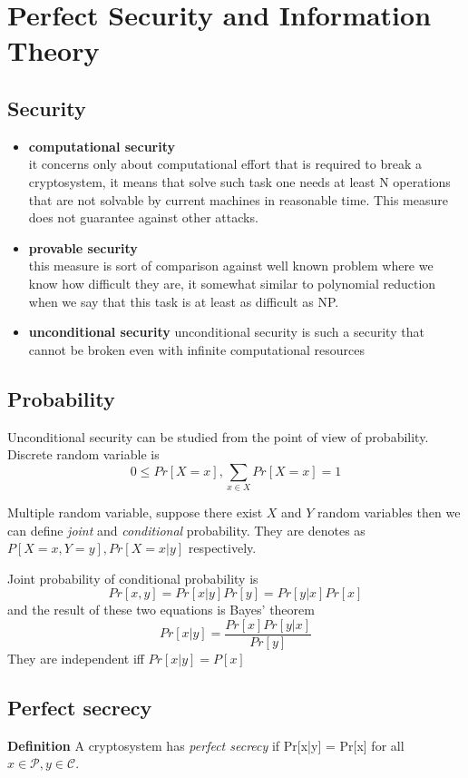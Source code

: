 \documentclass[a4paper,10pt]{article}
\begin{document}
\section*{Perfect Security and Information Theory}
\subsection*{Security}
\begin{itemize}
\item \textbf{computational security}\\ it concerns only about computational effort that is required to break a cryptosystem, it means that solve such task one needs at least N operations that are not solvable by current machines in reasonable time. This measure does not guarantee against other attacks.
\item \textbf{provable security}\\
this measure is sort of comparison against well known problem where we know how difficult they are, it somewhat similar to polynomial reduction when we say that this task is at least as difficult as NP.
\item \textbf{unconditional security}
unconditional security is such a security that cannot be broken even with infinite computational resources
\end{itemize}
\subsection*{Probability}
Unconditional security can be studied from the point of view of probability.
Discrete random variable is
$$
0 \leq Pr[X=x], \sum_{x \in X} Pr[X=x] = 1
$$

Multiple random variable, suppose there exist $X$ and $Y$ random variables then we can define \textit{joint} and \textit{conditional} probability. They are denotes as $P[X=x,Y=y],Pr[X=x|y]$ respectively.

Joint probability of conditional probability is 
$$
Pr[x,y] = Pr[x|y]Pr[y] = Pr[y|x]Pr[x]
$$
and the result of these two equations is Bayes' theorem
$$
Pr[x|y] = \frac{Pr[x]Pr[y|x]}{Pr[y]}
$$
They are independent iff $Pr[x|y]=P[x]$
\subsection*{Perfect secrecy}
\textbf{Definition} A cryptosystem has \textit{perfect secrecy} if Pr[x|y] = Pr[x] for all $x \in \mathcal{P}, y \in \mathcal{C}$.
\end{document}
